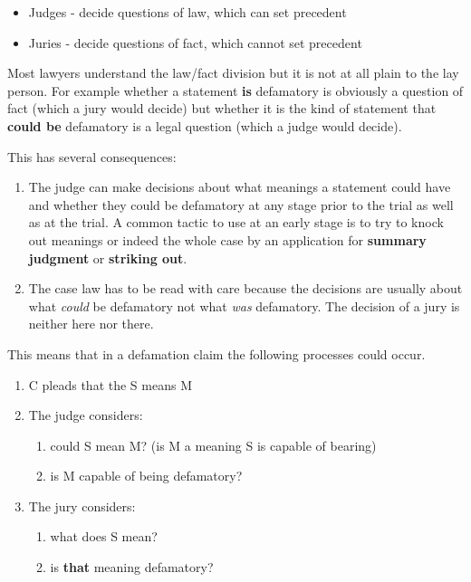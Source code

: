 \documentclass[]{article}
\begin{document}
\begin{itemize}
\item
  Judges - decide questions of law, which can set precedent
\item
  Juries - decide questions of fact, which cannot set precedent
\end{itemize}

{Most lawyers understand the law/fact division but it is not at all
plain to the lay person. For example whether a statement }\textbf{is}
{defamatory is obviously a question of fact (which a jury would decide)
but whether it is the kind of statement that }\textbf{could be}{
defamatory is a legal question (which a judge would decide).}

This has several consequences:

\begin{enumerate}
\item
  {The judge can make decisions about what meanings a statement could
  have and whether they could be defamatory at any stage prior to the
  trial as well as at the trial. A common tactic to use at an early
  stage is to try to knock out meanings or indeed the whole case by an
  application for }\textbf{summary judgment}{ or }\textbf{striking
  out}{.}
\item
  {The case law has to be read with care because the decisions are
  usually about what }\emph{{could}}{{ be defamatory not what
  }}\emph{{was}}{{ defamatory. The decision of a jury is neither here
  nor there.}}
\end{enumerate}

This means that in a defamation claim the following processes could
occur.

\begin{enumerate}
\item
  C pleads that the S means M
\item
  The judge considers:

  \begin{enumerate}
  \item
    could S mean M? (is M a meaning S is capable of bearing)
  \item
    is M capable of being defamatory?
  \end{enumerate}
\item
  The jury considers:

  \begin{enumerate}
  \item
    what does S mean?
  \item
    {is }\textbf{that}{ meaning defamatory?}
  \end{enumerate}
\end{enumerate}
\end{document}
